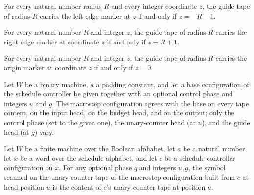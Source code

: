 \begin{lemma}
\label{Complexity.guideTape_left}
\leanok
{}
For every natural number radius $R$ and every integer coordinate $z$, the guide tape of
radius $R$ carries the left edge marker at $z$ if and only if $z=-R-1$.
\end{lemma}

\begin{lemma}
\label{Complexity.guideTape_right}
\leanok
{}
For every natural number $R$ and integer $z$, the guide tape of radius $R$ carries the
right edge marker at coordinate $z$ if and only if $z=R+1$.
\end{lemma}

\begin{lemma}
\label{Complexity.guideTape_origin}
\leanok
{}
For every natural number $R$ and integer $z$, the guide tape of radius $R$ carries the
origin marker at coordinate $z$ if and only if $z=0$.
\end{lemma}

\begin{definition}
\label{Complexity.macroCfg}
\leanok
{}
Let $W$ be a binary machine, $a$ a padding constant, and let a base configuration of
the schedule controller be given together with an optional control phase and integers
$u$ and $g$.  The macrostep configuration agrees with the base on every tape content,
on the input head, on the budget head, and on the output; only the control phase
(set to the given one), the unary-counter head (at $u$), and the guide head (at $g$)
vary.
\end{definition}

\begin{lemma}
\label{Complexity.macroCfg_unary}
\leanok
{}
Let $W$ be a finite machine over the Boolean alphabet, let $a$ be a natural number, let
$x$ be a word over the schedule alphabet, and let $c$ be a schedule-controller
configuration on $x$. For any optional phase $q$ and integers $u,g$, the symbol scanned
on the unary-counter tape of the macrostep configuration built from $c$ at head position
$u$ is the content of $c$'s unary-counter tape at position $u$.
\end{lemma}

